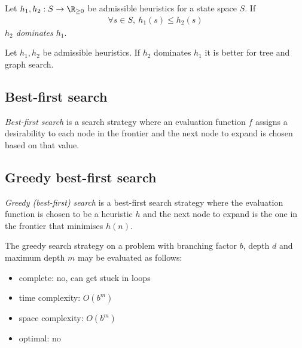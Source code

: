 \documentclass{article}
\begin{document}
\begin{definition}
    Let $h_1,h_2:S\to \R_{\geq 0}$ be admissible heuristics for a state
    space $S$. If
    \begin{align*}
        \forall s\in S,\: h_1(s) \leq h_2(s) 
    \end{align*}
    \emph{$h_2$ dominates $h_1$}.
\end{definition}

\begin{theorem}
    Let $h_1,h_2$ be admissible heuristics. If $h_2$ dominates $h_1$ it is
    better for tree and graph search.
\end{theorem}

\subsection{Best-first search}

\begin{definition}
    \emph{Best-first search} is a search strategy where an evaluation function
    $f$ assigns a desirability to each node in the frontier and the next node
    to expand is chosen based on that value.
\end{definition}

\subsection{Greedy best-first search}

\begin{definition}
    \emph{Greedy (best-first) search} is a best-first search strategy where the
    evaluation function is chosen to be a heuristic $h$ and the next node to
    expand is the one in the frontier that minimises $h(n)$.
\end{definition}

\begin{theorem}
    The greedy search strategy on a problem with branching factor $b$, depth
    $d$ and maximum depth $m$ may be evaluated as follows:
    \begin{itemize}
        \item complete: no, can get stuck in loops
        \item time complexity: $O(b^m)$
        \item space complexity: $O(b^m)$
        \item optimal: no
    \end{itemize}
\end{theorem}
\end{document}
